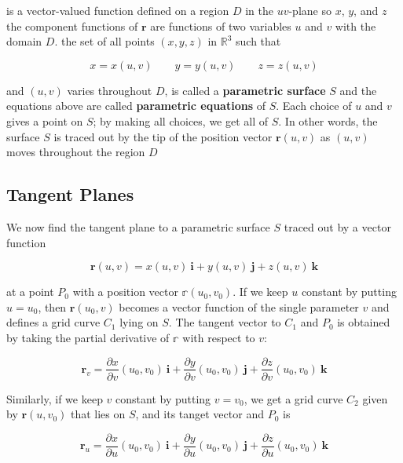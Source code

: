 \documentclass{article}
\begin{document}
is a vector-valued function defined on a region $D$ in the $uv$-plane so $x$, $y$, and $z$ the component functions of $\mathbf{r}$ are functions of two variables $u$ and $v$ with the domain $D$. the set of all points $(x,y,z)$ in $\mathbb{R}^3$ such that 

\begin{equation*}
    x = x(u,v) \qquad y = y(u,v) \qquad z = z(u,v)
\end{equation*}

and $(u,v)$ varies throughout $D$, is called a \textbf{parametric surface} $S$ and the equations above are called \textbf{parametric equations} of $S$. Each choice of $u$ and $v$ gives a point on $S$; by making all choices, we get all of $S$. In other words, the surface $S$ is traced out by the tip of the position vector $\mathbf{r}(u,v)$ as $(u,v)$ moves throughout the region $D$

\subsection{Tangent Planes}

We now find the tangent plane to a parametric surface $S$ traced out by a vector function 

\begin{equation*}
    \mathbf{r}(u,v) = x(u,v) \ \mathbf{i} + y(u,v) \ \mathbf{j} + z(u,v) \ \mathbf{k}
\end{equation*}

at a point $P_0$ with a position vector $\mathbb{r}(u_0, v_0)$. If we keep $u$ constant by putting $u = u_0$, then $\mathbf{r}(u_0,v)$ becomes a vector function of the single parameter $v$ and defines a grid curve $C_1$ lying on $S$. The tangent vector to $C_1$ and $P_0$ is obtained by taking the partial derivative of $\mathbb{r}$ with respect to $v$: 

\begin{equation*}
    \mathbf{r}_v    = \frac{\partial x}{\partial v}(u_0,v_0) \ \mathbf{i} + \frac{\partial y}{\partial v}(u_0,v_0) \ \mathbf{j} + \frac{\partial z}{\partial v} (u_0, v_0)  \ \mathbf{k}
\end{equation*}

Similarly, if we keep $v$ constant by putting $v = v_0$, we get a grid curve $C_2$ given by $\mathbf{r}(u,v_0)$ that lies on $S$, and its tanget vector and $P_0$ is

\begin{equation*}
    \mathbf{r}_u    = \frac{\partial x}{\partial u}(u_0,v_0) \ \mathbf{i} + \frac{\partial y}{\partial u}(u_0,v_0) \ \mathbf{j} + \frac{\partial z}{\partial u} (u_0, v_0)  \ \mathbf{k}
\end{equation*}
\end{document}
